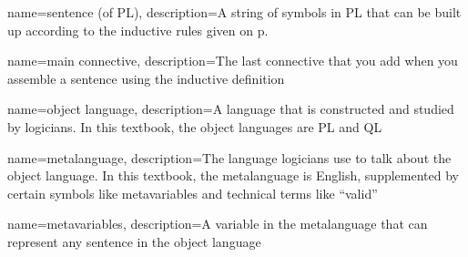 {
name=sentence (of PL),
description={A string of symbols in PL that can be built up according to the inductive rules given on p.~\pageref{PLsentences}}
}

{
name=main connective,
description={The last connective that you add when you assemble a sentence using the inductive definition}
}

{
name=object language,
description={A language that is constructed and studied by logicians. In this textbook,
 the object languages are PL and QL}
}

{
name=metalanguage,
description={The language logicians use to talk about the object language. In this textbook, the metalanguage is English, supplemented by certain symbols like metavariables and technical terms like ``valid''}
}

{
name=metavariables,
description={A variable in the metalanguage that can represent any sentence in the object language}
}